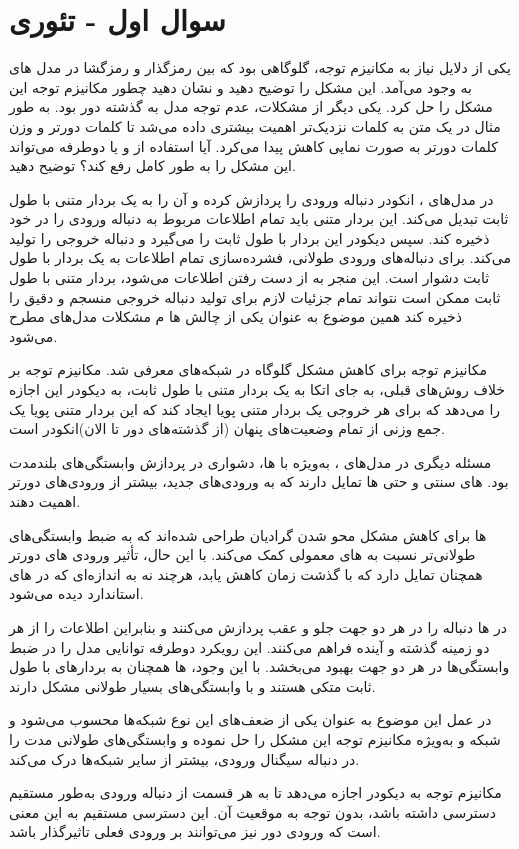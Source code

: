 \section{سوال اول - تئوری}

یکی از دلایل نیاز به مکانیزم توجه، گلوگاهی بود که بین رمزگذار و رمزگشا در مدل های  به وجود می‌آمد. این مشکل را توضیح دهید و نشان دهید چطور مکانیزم توجه این مشکل را حل کرد. یکی دیگر از مشکلات، عدم توجه مدل به گذشته دور بود. به طور مثال در یک متن به کلمات نزدیک‌تر اهمیت بیشتری داده می‌شد تا کلمات دورتر و وزن کلمات دورتر به صورت نمایی کاهش پیدا می‌کرد. آیا استفاده از  و یا  دوطرفه می‌تواند این مشکل را به طور کامل رفع کند؟ توضیح دهید.
	




\begin{qsolve}
در مدل‌های ، انکودر دنباله ورودی را پردازش کرده و آن را به یک بردار متنی با طول ثابت تبدیل می‌کند. این بردار متنی باید تمام اطلاعات مربوط به دنباله ورودی را در خود ذخیره کند.
سپس دیکودر این بردار با طول ثابت را می‌گیرد و دنباله خروجی را تولید می‌کند. برای دنباله‌های ورودی طولانی، فشرده‌سازی تمام اطلاعات به یک بردار با طول ثابت دشوار است. این منجر به از دست رفتن اطلاعات می‌شود، بردار متنی با طول ثابت ممکن است نتواند تمام جزئیات لازم برای تولید دنباله خروجی منسجم و دقیق را ذخیره کند همین موضوع به عنوان یکی از چالش ها م مشکلات مدل‌های  مطرح می‌شود.

مکانیزم توجه برای کاهش مشکل گلوگاه در شبکه‌های  معرفی شد. مکانیزم توجه بر خلاف روش‌های قبلی، به جای اتکا به یک بردار متنی با طول ثابت، به دیکودر این اجازه را می‌دهد که برای هر خروجی یک بردار متنی پویا ایجاد کند که این بردار متنی پویا یک جمع وزنی از تمام وضعیت‌های پنهان (از گذشته‌های دور تا الان)انکودر است.

مسئله دیگری در مدل‌های ، به‌ویژه با ها، دشواری در پردازش وابستگی‌های بلندمدت بود. های سنتی و حتی ها تمایل دارند که به ورودی‌های جدید، بیشتر از ورودی‌های دورتر اهمیت دهند. 

ها برای کاهش مشکل محو شدن گرادیان طراحی شده‌اند که به ضبط وابستگی‌های طولانی‌تر نسبت به های معمولی کمک می‌کند. با این حال، تأثیر ورودی های دورتر همچنان تمایل دارد که با گذشت زمان کاهش یابد، هرچند نه به اندازه‌ای که در های استاندارد دیده می‌شود.

در ها دنباله را در هر دو جهت جلو و عقب پردازش می‌کنند و بنابراین اطلاعات را از هر دو زمینه گذشته و آینده فراهم می‌کنند.
این رویکرد دوطرفه توانایی مدل را در ضبط وابستگی‌ها در هر دو جهت بهبود می‌بخشد.
با این وجود، ها همچنان به بردارهای با طول ثابت متکی هستند و با وابستگی‌های بسیار طولانی مشکل دارند.

در عمل این موضوع به عنوان یکی از ضعف‌های این نوع شبکه‌ها محسوب می‌شود و شبکه  و به‌ویژه مکانیزم توجه این مشکل را حل نموده و وابستگی‌های طولانی مدت را در دنباله سیگنال ورودی، بیشتر از سایر شبکه‌ها درک می‌کند.

مکانیزم توجه به دیکودر اجازه می‌دهد تا به هر قسمت از دنباله ورودی به‌طور مستقیم دسترسی داشته باشد، بدون توجه به موقعیت آن. این دسترسی مستقیم به این معنی است که ورودی دور نیز می‌توانند بر ورودی فعلی تاثیرگذار باشد.
	
\end{qsolve}
